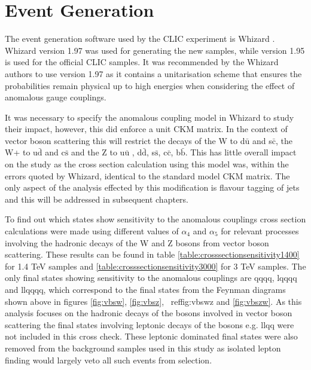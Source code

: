 \fi

\section{Event Generation}

The event generation software used by the CLIC experiment is Whizard \cite{0708.4233, hep-ph/0102195}. Whizard version 1.97 was used for generating the new samples, while version 1.95 is used for the official CLIC samples. It was recommended by the Whizard authors to use version 1.97 as it contains a unitarisation scheme that ensures the probabilities remain physical up to high energies when considering the effect of anomalous gauge couplings. 

It was necessary to specify the anomalous coupling model in Whizard to study their impact, however, this did enforce a unit CKM matrix. In the context of vector boson scattering this will restrict the decays of the W  to d$\bar{\text{u}}$ and s$\bar{\text{c}}$, the W+ to u$\bar{\text{d}}$ and c$\bar{\text{s}}$ and the Z to u$\bar{\text{u}}$ , d$\bar{\text{d}}$, s$\bar{\text{s}}$, c$\bar{\text{c}}$, b$\bar{\text{b}}$. This has little overall impact on the study as the cross section calculation using this model was, within the errors quoted by Whizard, identical to the standard model CKM matrix. The only aspect of the analysis effected by this modification is flavour tagging of jets and this will be addressed in subsequent chapters.

To find out which states show sensitivity to the anomalous couplings cross section calculations were made using different values of $\alpha_{4}$ and $\alpha_{5}$ for relevant processes involving the hadronic decays of the W and Z bosons from vector boson scattering.  These results can be found in table \ref{table:crosssectionsensitivity1400} for 1.4 TeV samples and \ref{table:crosssectionsensitivity3000} for 3 TeV samples.  The only final states showing sensitivity to the anomalous couplings are \nu{\nu}qqqq, l{\nu}qqqq and llqqqq, which correspond to the final states from the Feynman diagrams shown above in figures \ref{fig:vbsw}, \ref{fig:vbsz}, \ ref{fig:vbswz} and \ref{fig:vbszw}.  As this analysis focuses on the hadronic decays of the bosons involved in vector boson scattering the final states involving leptonic decays of the bosons e.g. \nu{\nu}llqq were not included in this cross check. These leptonic dominated final states were also removed from the background samples used in this study as isolated lepton finding would largely veto all such events from selection.

